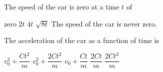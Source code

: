 \documentclass{../../oss-apphys-exam}
\begin{document}
\begin{multicols*}{2}
\begin{questions}

    \question The speed of the car is zero at a time $t$ of
    \begin{choices}
      \choice zero
      \choice $2t$
      \choice $4t$
      \choice $\sqrt{8t}$
      \choice The speed of the car is never zero.
    \end{choices}
    \label{car1}
    
    \question The acceleration of the car as a function of time is
    \begin{choices}
      \choice $v_0^2+\dfrac{Ct^2}m$
      \choice $v_0^2+\dfrac{2Ct^2}m$
      \choice $v_0+\dfrac{Ct}m$
      \choice $\dfrac{2Ct}m$
      \choice $\dfrac{2Ct^2}m$
    \end{choices}
    \label{car2}
  
%      
%
%
%    
%    


\end{questions}
\end{multicols*}
\end{document}
